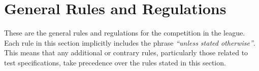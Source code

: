\chapter{General Rules and Regulations}\label{chap:rules}

These are the general rules and regulations for the competition in the \RoboCup\AtHome{} league.
Each rule in this section implicitly includes the phrase \emph{\enquote{unless stated otherwise}}.
This means that any additional or contrary rules, particularly those related to test specifications, take precedence over the rules stated in this section.



%

















%
